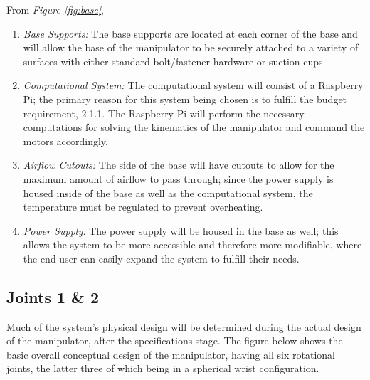 \documentclass[12pt]{report}
\begin{document}
From \emph{Figure \ref{fig:base}},
\begin{enumerate}[label=\alph*.]
  \item \emph{Base Supports:}
  The base supports are located at each corner of the base and will allow the base of the manipulator to be securely attached to a variety of surfaces with either standard bolt/fastener hardware or suction cups.
  \item \emph{Computational System:}
  The computational system will consist of a Raspberry Pi; the primary reason for this system being chosen is to fulfill the budget requirement, 2.1.1. The Raspberry Pi will perform the necessary computations for solving the kinematics of the manipulator and command the motors accordingly.
  \item \emph{Airflow Cutouts:}
  The side of the base will have cutouts to allow for the maximum amount of airflow to pass through; since the power supply is housed inside of the base as well as the computational system, the temperature must be regulated to prevent overheating.
  \item \emph{Power Supply:}
  The power supply will be housed in the base as well; this allows the system to be more accessible and therefore more modifiable, where the end-user can easily expand the system to fulfill their needs.
\end{enumerate}

\subsection{Joints 1 \& 2}
Much of the system’s physical design will be determined during the actual design of the manipulator, after the specifications stage. The figure below shows the basic overall conceptual design of the manipulator, having all six rotational joints, the latter three of which being in a spherical wrist configuration.
\newpage
%
%
%

%
%   
\end{document}
